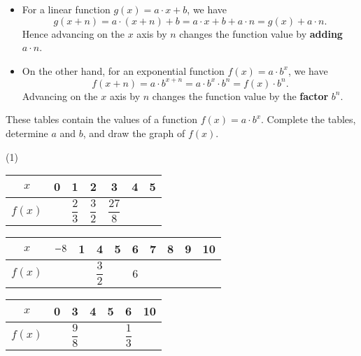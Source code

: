 \begin{itemize}
	\item For a linear function $g\left(x\right)=a\cdot x+b$, we have
	\begin{equation*}
		g\left(x+n\right)=a\cdot\left(x+n\right)+b=a\cdot x+b+a\cdot n=g\left(x\right)+a\cdot n.
	\end{equation*}
	Hence advancing on the $x$ axis by $n$ changes the function value by \textbf{adding} $a\cdot n$.
	\item On the other hand, for an exponential function $f(x)=a\cdot b^x$, we have
	\begin{equation*}
		f\left(x+n\right)=a\cdot b^{x+n}=a\cdot b^x\cdot b^n=f\left(x\right)\cdot b^n.
	\end{equation*}
	Advancing on the $x$ axis by $n$ changes the function value by the \textbf{factor} $b^n$.
\end{itemize}
\begin{exercise}
	These tables contain the values of a function $f\left(x\right)=a\cdot b^x$.
	Complete the tables, determine $a$ and $b$, and draw the graph of $f\left(x\right)$.
	\renewcommand{\arraystretch}{2}
	\setlength{\tabcolsep}{15pt}
	\begin{tasks}(1)
		\task \hspace{10pt} \begin{tabular}{|c|c|c|c|c|c|c|}\hline
			$x$ & 0 & 1 & 2 & 3 & 4 & 5 \\ \hline
			$f\left(x\right)$ & & $\dfrac{2}{3}$ & $\dfrac{3}{2}$ & $\dfrac{27}{8}$ & &  \\[6pt] \hline
		\end{tabular} \vspace{30pt}
		\task \hspace{10pt} \begin{tabular}{|c|c|c|c|c|c|c|c|c|c|}\hline
			$x$ & $\smash{-}8$ & 1 & 4 & 5 & 6 & 7 & 8 & 9 & 10 \\ \hline
			$f\left(x\right)$ &  &  & $\dfrac{3}{2}$ & & 6 & & & & \\[6pt] \hline
		\end{tabular} \vspace{15pt}
		\task \hspace{10pt} \begin{tabular}{|c|c|c|c|c|c|c|}\hline
			$x$ & 0 & 3 & 4 & 5 & 6 & 10 \\ \hline
			$f\left(x\right)$ &  & $\dfrac{9}{8}$ &  & & $\dfrac{1}{3}$ & \\[6pt] \hline
		\end{tabular}
	\end{tasks}
\end{exercise}
